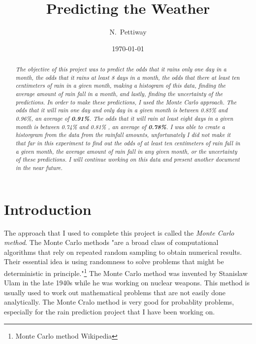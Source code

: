 \documentclass[twocolumn]{revtex4}
\begin{document}
\title{
\bf Predicting the Weather
}

\author{N.~Pettiway}

\date{\today}

\begin{abstract}

   {\it  The objective of this project was to predict the odds that it rains only one day in a month, the odds that it rains at least 8 days in a month, the odds that there at least ten centimeters of rain in a given month, making a histogram of this data, finding the average amount of rain fall in a month, and lastly, finding the uncertainty of the predictions. In order to make these predictions, I used the Monte Carlo approach. The odds that it will rain one day and only day in a given month is between 0.85\%  and  0.96\%, an average of {\bf 0.91\%}. The odds that it will rain at least eight days in a given month is between 0.74\% and 0.81\% , an average of {\bf 0.78\%}. I was able to create a historgram from the data from the rainfall amounts, unfortunately I did not make it that far in this experiment to find out the odds of at least ten centimeters of rain fall in a given month, the average amount of rain fall in any given month, or the uncertainty of these predictions. I will continue working on this data and present another document in the near future.}  
   
\end{abstract}

\maketitle

\section{\bf Introduction}
The approach that I used to complete this project is called the {\it Monte Carlo method}. The Monte Carlo methods "are a broad class of computational algorithms that rely on repeated random sampling to obtain numerical results. Their essential idea is using randomness to solve problems that might be deterministic in principle."\footnote{Monte Carlo method Wikipedia} The Monte Carlo method was invented by Stanislaw Ulam in the late 1940s while he was working on nuclear weapons. This method is usually used to work out mathematical problems that are not easily done analytically. The Monte Cralo method is very good for probablity problems, especially for the rain prediction project that I have been working on. 
\end{document}
